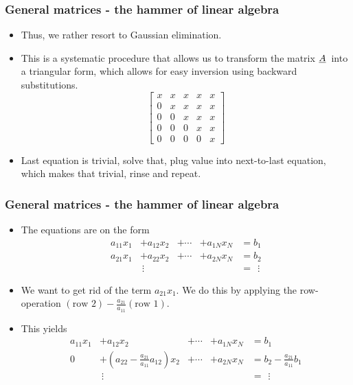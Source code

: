 \documentclass{beamer}
\newcommand{\ub}[1]{\underbar{$#1$}\,}
\begin{document}
\begin{frame}\frametitle{General matrices - the hammer of linear algebra}
  \begin{itemize}
    \item Thus, we rather resort to Gaussian elimination. 
    \item This is a systematic procedure
      that allows us to transform the matrix $\ub{A}$ into a triangular form,
      which allows for easy inversion using backward substitutions.
      \[
        \begin{bmatrix}
          x & x & x & x & x \\
          0 & x & x & x & x \\ 
          0 & 0 & x & x & x \\ 
          0 & 0 & 0 & x & x \\ 
          0 & 0 & 0 & 0 & x
        \end{bmatrix}
      \]
    \item Last equation is trivial, solve that, plug value into next-to-last equation, which
      makes that trivial, rinse and repeat.
  \end{itemize}
\end{frame}
\begin{frame}\frametitle{General matrices - the hammer of linear algebra}
  \begin{itemize}
    \item The equations are on the form
      \[
        \begin{aligned}
          a_{11}x_1 &+ a_{12}x_2 &+ \cdots & +a_{1N}x_N &= b_1 \\
                                             a_{21}x_1 &+ a_{22}x_2 &+ \cdots & +a_{2N}x_N &= b_2 \\
                                                                                          &\ \vdots  & & &=\ \ \vdots
        \end{aligned}
      \]
    \item We want to get rid of the term $a_{21}x_1$. We do this by applying the
      row-operation $\left(\text{row 2}\right)-\frac{a_{21}}{a_{11}}\left(\text{row 1}\right)$.
    \item This yields
      \[
        \begin{aligned}
          a_{11}x_1 &+ a_{12}x_2 &+ \cdots & +a_{1N}x_N &= b_1 \\
                                                     0 &+ \left(a_{22}-\frac{a_{21}}{a_{11}}a_{12}\right)x_2 &+ \cdots & +a_{2N}x_N &= b_2 -\frac{a_{21}}{a_{11}}b_1 \\
                                                                                          &\ \vdots  & & &=\ \  \vdots
        \end{aligned}
      \]
  \end{itemize}
\end{frame}
\end{document}

